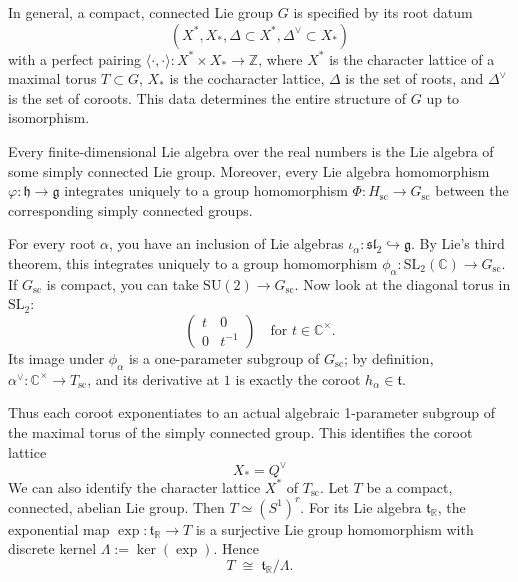 \documentclass[12pt]{article}
\begin{document}
In general, a compact, connected Lie group $G$ is specified by its root datum \[(X^*,X_*,\Delta \subset X^*,\Delta^\vee \subset X_*)\] with a perfect pairing $\langle \cdot, \cdot \rangle: X^* \times X_* \to \mathbb{Z}$, where $X^*$ is the character lattice of a maximal torus $T \subset G$, $X_*$ is the cocharacter lattice, $\Delta$ is the set of roots, and $\Delta^\vee$ is the set of coroots. This data determines the entire structure of $G$ up to isomorphism.
\begin{theorem}
     Every finite-dimensional Lie algebra over the real numbers is the Lie algebra of some simply connected Lie group. Moreover, every Lie algebra homomorphism $\varphi:\mathfrak{h}\to \mathfrak{g}$ integrates uniquely to a group homomorphism $\Phi:H_{\mathrm{sc}}\to G_{\mathrm{sc}}$ between the corresponding simply connected groups.

\end{theorem}
For every root $\alpha$, you have an inclusion of Lie algebras $\iota_\alpha:\mathfrak{sl}_2 \hookrightarrow \mathfrak{g}$. By Lie's third theorem, this integrates uniquely to a group homomorphism $\phi_\alpha: \mathrm{SL}_2(\mathbb{C}) \longrightarrow G_{\mathrm{sc}}$. If $G_{\mathrm{sc}}$ is compact, you can take $\mathrm{SU}(2)\to G_{\mathrm{sc}}$. Now look at the diagonal torus in $\mathrm{SL}_2$:
\[
    \left(\begin{matrix}
            t & 0      \\
            0 & t^{-1}
        \end{matrix}\right)
    \quad\text{for }t\in \mathbb{C}^\times.
\]
Its image under $\phi_\alpha$ is a one-parameter subgroup of $G_{\mathrm{sc}}$; by definition, $\alpha^\vee : \mathbb{C}^\times \to T_{\mathrm{sc}}$, and its derivative at $1$ is exactly the coroot $h_\alpha\in\mathfrak{t}$.

Thus each coroot exponentiates to an actual algebraic 1-parameter subgroup of the maximal torus of the simply connected group. This identifies the coroot lattice \[
    X_* = Q^\vee
\]
We can also identify the character lattice $X^*$ of $T_{\mathrm{sc}}$. Let $T$ be a compact, connected, abelian Lie group. Then $T\simeq(S^1)^r$.
For its Lie algebra $\mathfrak t_\mathbb{R}$, the exponential map
$\exp:\mathfrak t_\mathbb{R}\to T$
is a surjective Lie group homomorphism with discrete kernel $\Lambda:=\ker(\exp)$. Hence
\[
    T\;\cong\;\mathfrak t_\mathbb{R}/\Lambda. \tag{1}
\]
\end{document}
